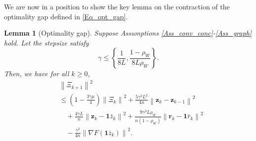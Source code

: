 \documentclass[10pt,a4paper]{amsart}
\newtheorem{Lem}{Lemma}
\begin{document}
We are now in a position to show the key lemma on the contraction of the optimality gap defined in \eqref{Eq_opt_gap}.



\begin{Lem}[Optimality gap]\label{Lem_opt}
Suppose Assumptions \ref{Ass_conv_conc}-\ref{Ass_graph} hold. Let the stepsize satisfy 
\begin{equation}\label{Eq_stepsize_opt}
\gamma \leqslant \left\{ \frac{1}{8L}, \frac{1-\rho _W}{8L\rho _W} \right\}.
\end{equation}
Then, we have for all $k\geqslant0$,
\begin{equation}
\begin{aligned}
&\left\| \varXi _{k+1} \right\| ^2
\\
&\leqslant \left( 1-\frac{3\gamma \mu}{4} \right) \left\| \varXi _k \right\| ^2+\frac{5\gamma ^2L^2}{4n}\left\| \mathbf{z}_k-\mathbf{z}_{k-1} \right\| ^2
\\
&\quad +\frac{4\gamma L}{n}\left\| \mathbf{z}_k-\mathbf{1}\bar{z}_k \right\| ^2+\frac{9\gamma ^3L\rho _W}{n\left( 1-\rho _W \right)}\left\| \mathbf{r}_k-\mathbf{1}\bar{r}_k \right\| ^2
\\
&\quad -\frac{\gamma ^2}{4n}\left\| \nabla F\left( \mathbf{1}\bar{z}_k \right) \right\| ^2.
\end{aligned}
\end{equation}
\end{Lem}
\end{document}

